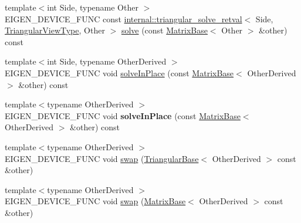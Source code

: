 \begin{DoxyCompactItemize}
\item 
{\footnotesize template$<$int Side, typename Other $>$ }\\E\+I\+G\+E\+N\+\_\+\+D\+E\+V\+I\+C\+E\+\_\+\+F\+U\+NC const \mbox{\hyperlink{struct_eigen_1_1internal_1_1triangular__solve__retval}{internal\+::triangular\+\_\+solve\+\_\+retval}}$<$ Side, \mbox{\hyperlink{class_eigen_1_1_triangular_view}{Triangular\+View\+Type}}, Other $>$ \mbox{\hyperlink{class_eigen_1_1_triangular_view_impl_3_01___matrix_type_00_01___mode_00_01_dense_01_4_a1a8d18cb8da794090603a5c263c15395}{solve}} (const \mbox{\hyperlink{class_eigen_1_1_matrix_base}{Matrix\+Base}}$<$ Other $>$ \&other) const
\item 
{\footnotesize template$<$int Side, typename Other\+Derived $>$ }\\E\+I\+G\+E\+N\+\_\+\+D\+E\+V\+I\+C\+E\+\_\+\+F\+U\+NC void \mbox{\hyperlink{class_eigen_1_1_triangular_view_impl_3_01___matrix_type_00_01___mode_00_01_dense_01_4_a7862f7a93e5ec9d1ea3fc144cca0e5f7}{solve\+In\+Place}} (const \mbox{\hyperlink{class_eigen_1_1_matrix_base}{Matrix\+Base}}$<$ Other\+Derived $>$ \&other) const
\item 
\mbox{\label{class_eigen_1_1_triangular_view_impl_3_01___matrix_type_00_01___mode_00_01_dense_01_4_adffbc981a7097cfdc4b9c5f02cb888f8}} 
{\footnotesize template$<$typename Other\+Derived $>$ }\\E\+I\+G\+E\+N\+\_\+\+D\+E\+V\+I\+C\+E\+\_\+\+F\+U\+NC void {\bfseries solve\+In\+Place} (const \mbox{\hyperlink{class_eigen_1_1_matrix_base}{Matrix\+Base}}$<$ Other\+Derived $>$ \&other) const
\item 
{\footnotesize template$<$typename Other\+Derived $>$ }\\E\+I\+G\+E\+N\+\_\+\+D\+E\+V\+I\+C\+E\+\_\+\+F\+U\+NC void \mbox{\hyperlink{class_eigen_1_1_triangular_view_impl_3_01___matrix_type_00_01___mode_00_01_dense_01_4_a154127e98e3b30d829220c61eb3c12b1}{swap}} (\mbox{\hyperlink{class_eigen_1_1_triangular_base}{Triangular\+Base}}$<$ Other\+Derived $>$ const \&other)
\item 
{\footnotesize template$<$typename Other\+Derived $>$ }\\E\+I\+G\+E\+N\+\_\+\+D\+E\+V\+I\+C\+E\+\_\+\+F\+U\+NC void \mbox{\hyperlink{class_eigen_1_1_triangular_view_impl_3_01___matrix_type_00_01___mode_00_01_dense_01_4_a4723aa22f7e47d8d125079fe4f40f950}{swap}} (\mbox{\hyperlink{class_eigen_1_1_matrix_base}{Matrix\+Base}}$<$ Other\+Derived $>$ const \&other)

\end{DoxyCompactItemize}
